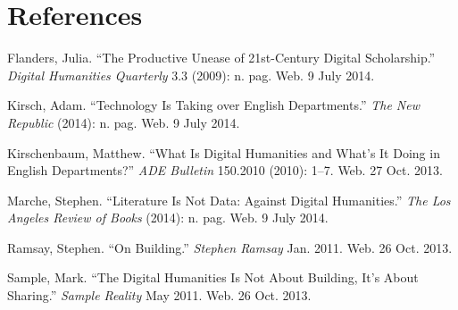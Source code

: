\documentclass[]{article}
\begin{document}
\section*{References}\label{references}

Flanders, Julia. ``The Productive Unease of 21st-Century Digital
Scholarship.'' \emph{Digital Humanities Quarterly} 3.3 (2009): n. pag.
Web. 9 July 2014.

Kirsch, Adam. ``Technology Is Taking over English Departments.''
\emph{The New Republic} (2014): n. pag. Web. 9 July 2014.

Kirschenbaum, Matthew. ``What Is Digital Humanities and What's It Doing
in English Departments?'' \emph{ADE Bulletin} 150.2010 (2010): 1--7.
Web. 27 Oct. 2013.

Marche, Stephen. ``Literature Is Not Data: Against Digital Humanities.''
\emph{The Los Angeles Review of Books} (2014): n. pag. Web. 9 July 2014.

Ramsay, Stephen. ``On Building.'' \emph{Stephen Ramsay} Jan. 2011. Web.
26 Oct. 2013.

Sample, Mark. ``The Digital Humanities Is Not About Building, It's About
Sharing.'' \emph{Sample Reality} May 2011. Web. 26 Oct. 2013.
\end{document}
